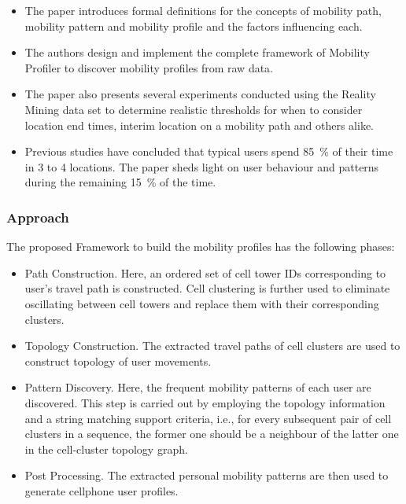 \begin{itemize}
	
	\item The paper introduces formal definitions for the concepts of mobility path, mobility 
	pattern and mobility profile and the factors influencing each. 
	
	\item The authors design and implement the complete framework of Mobility Profiler to 
	discover mobility profiles from raw data. 
	
	\item The paper also presents several experiments conducted using the Reality Mining data 
	set to determine realistic thresholds for when to consider location end times, interim 
	location on a mobility path and others alike. 
	
	\item Previous studies have concluded that typical users spend 85~\% of their time in
	3 to 4 locations. The paper sheds light on user behaviour and patterns during the 
	remaining 15~\% of the time. 
		 
\end{itemize}

\subsubsection*{Approach}

The proposed Framework to build the mobility profiles has the following phases:

\begin{itemize}

	\item Path Construction. Here, an ordered set of cell tower IDs corresponding to 
	user's travel path is constructed. Cell clustering is further used to eliminate 
	oscillating between cell towers and replace them with their corresponding clusters. 
	
	\item Topology Construction. The extracted travel paths of cell clusters are used to 
	construct topology of user movements. 
	
	\item Pattern Discovery. Here, the frequent mobility patterns of each user are discovered. 
	This step is carried out by employing the topology information and a string matching 
	support criteria, i.e., for every subsequent pair of cell clusters in a sequence, the 
	former one should be a neighbour of the latter one in the cell-cluster topology graph. 
	
	\item Post Processing. The extracted personal mobility patterns are then used to generate
	cellphone user profiles. 
	 
\end{itemize}


